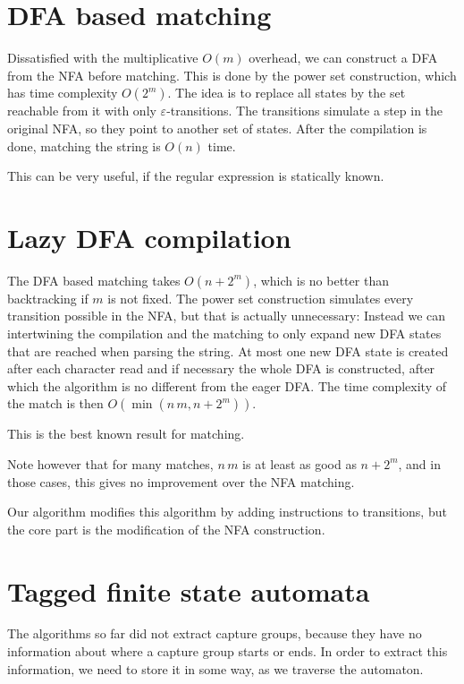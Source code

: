 \documentclass[11pt,a4paper,twoside,openright]{Thesis}
\theoremstyle{definition}
\newcommand{\seclabel}[1]{\label{sec:#1}}
\begin{document}
\section{DFA based matching}\label{sec:dfa-match}
Dissatisfied with the multiplicative $O(m)$ overhead, we can construct a DFA
from the NFA before matching. This is done by the power set
construction\cite{Sips05a}, which has time complexity $O(2^m)$. The idea is to
replace all states by the set reachable from it with only
$\varepsilon$-transitions. The transitions simulate a step in the original NFA,
so they point to another set of states.  After the compilation is done,
matching the string is $O(n)$ time.

This can be very useful, if the regular expression is statically known.

\section{Lazy DFA compilation}\label{sec:lazy-dfa-match}
The DFA based matching takes $O(n + 2^m)$, which is no better than backtracking
if $m$ is not fixed. The power set construction simulates every transition
possible in the NFA, but that is actually unnecessary: Instead we can
intertwining the compilation and the matching to only expand new DFA states that
are reached when parsing the string. At most one new DFA state is created after
each character read and if necessary the whole DFA is constructed, after
which the algorithm is no different from the eager DFA\@. The time complexity of
the match is then $O(\min(n\, m, n+2^m))$.

This is the best known result for matching\cite{Cox07a,Cox09a,Cox10a}.

Note however that for many matches, $n\, m$ is at least as good as $n+2^m$, 
and in those cases, this gives no improvement over the NFA matching.

Our algorithm modifies this algorithm by adding instructions to transitions, 
but the core part is the modification of the NFA construction.

\section{Tagged finite state automata}\seclabel{tfsa}
The algorithms so far did not extract capture groups, because they have no
information about where a capture group starts or ends. In order to extract
this information, we need to store it in some way, as we traverse the
automaton.
\end{document}
